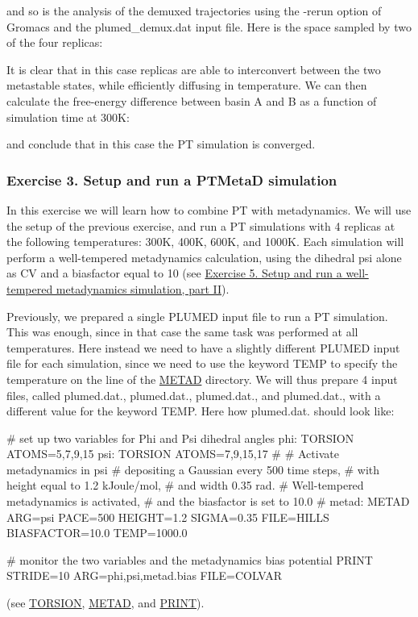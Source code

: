and so is the analysis of the demuxed trajectories using the -\/rerun option of Gromacs and the plumed\+\_\+demux.\+dat input file. Here is the space sampled by two of the four replicas\+:

\label{belfast-7_belfast-7-pt2demux-fig}%
\hypertarget{belfast-7_belfast-7-pt2demux-fig}{}%
 It is clear that in this case replicas are able to interconvert between the two metastable states, while efficiently diffusing in temperature. We can then calculate the free-\/energy difference between basin A and B as a function of simulation time at 300\+K\+:

\label{belfast-7_belfast-7-pt2fes-fig}%
\hypertarget{belfast-7_belfast-7-pt2fes-fig}{}%
 and conclude that in this case the P\+T simulation is converged.\hypertarget{belfast-7_belfast-7-exercise-3}{}\subsubsection{Exercise 3. Setup and run a P\+T\+Meta\+D simulation}\label{belfast-7_belfast-7-exercise-3}
In this exercise we will learn how to combine P\+T with metadynamics. We will use the setup of the previous exercise, and run a P\+T simulations with 4 replicas at the following temperatures\+: 300\+K, 400\+K, 600\+K, and 1000\+K. Each simulation will perform a well-\/tempered metadynamics calculation, using the dihedral psi alone as C\+V and a biasfactor equal to 10 (see \hyperlink{belfast-6_belfast-6-exercise-5}{Exercise 5. Setup and run a well-\/tempered metadynamics simulation, part I\+I}).

Previously, we prepared a single P\+L\+U\+M\+E\+D input file to run a P\+T simulation. This was enough, since in that case the same task was performed at all temperatures. Here instead we need to have a slightly different P\+L\+U\+M\+E\+D input file for each simulation, since we need to use the keyword T\+E\+M\+P to specify the temperature on the line of the \hyperlink{METAD}{M\+E\+T\+A\+D} directory. We will thus prepare 4 input files, called plumed.\+dat., plumed.\+dat., plumed.\+dat., and plumed.\+dat., with a different value for the keyword T\+E\+M\+P. Here how plumed.\+dat. should look like\+:

\begin{DoxyVerb}# set up two variables for Phi and Psi dihedral angles 
phi: TORSION ATOMS=5,7,9,15
psi: TORSION ATOMS=7,9,15,17
#
# Activate metadynamics in psi
# depositing a Gaussian every 500 time steps,
# with height equal to 1.2 kJoule/mol,
# and width 0.35 rad.
# Well-tempered metadynamics is activated,
# and the biasfactor is set to 10.0
#
metad: METAD ARG=psi PACE=500 HEIGHT=1.2 SIGMA=0.35 FILE=HILLS BIASFACTOR=10.0 TEMP=1000.0

# monitor the two variables and the metadynamics bias potential
PRINT STRIDE=10 ARG=phi,psi,metad.bias FILE=COLVAR\end{DoxyVerb}
 (see \hyperlink{TORSION}{T\+O\+R\+S\+I\+O\+N}, \hyperlink{METAD}{M\+E\+T\+A\+D}, and \hyperlink{PRINT}{P\+R\+I\+N\+T}).

